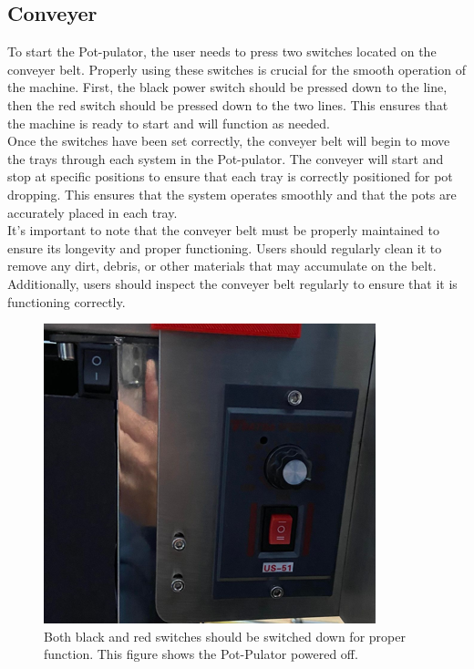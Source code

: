 \documentclass[12pt, titlepage]{article}
\begin{document}
\subsection{Conveyer}
To start the Pot-pulator, the user needs to press two switches located on the conveyer belt. Properly using these switches is crucial for the smooth operation of the machine. First, the black power switch should be pressed down to the line, then the red switch should be pressed down to the two lines. This ensures that the machine is ready to start and will function as needed.
\\
\noindent Once the switches have been set correctly, the conveyer belt will begin to move the trays through each system in the Pot-pulator. The conveyer will start and stop at specific positions to ensure that each tray is correctly positioned for pot dropping. This ensures that the system operates smoothly and that the pots are accurately placed in each tray.
\\
\noindent It's important to note that the conveyer belt must be properly maintained to ensure its longevity and proper functioning. Users should regularly clean it to remove any dirt, debris, or other materials that may accumulate on the belt. Additionally, users should inspect the conveyer belt regularly to ensure that it is functioning correctly.

\begin{figure}[H]
    \centering
    \includegraphics{switches.png}
    \caption{Both black and red switches should be switched down for proper function. This figure shows the Pot-Pulator powered off.}
    \label{fig:scope}
  \end{figure}
\newpage
\end{document}
